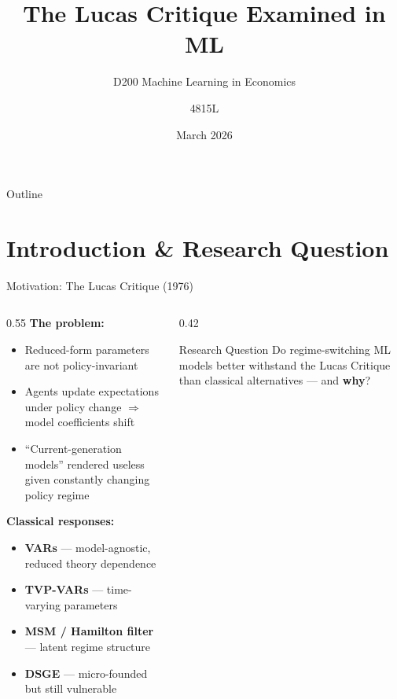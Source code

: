 \documentclass[aspectratio=169, 10pt]{beamer}
\title[Lucas Critique \& ML]{The Lucas Critique Examined in ML}
\subtitle{D200 Machine Learning in Economics}
\author{4815L}
\institute{University of Cambridge}
\date{March 2026}
\begin{document}
\begin{frame}
  \titlepage
\end{frame}

\begin{frame}{Outline}
  \tableofcontents
\end{frame}

\section{Introduction \& Research Question}

\begin{frame}{Motivation: The Lucas Critique (1976)}

  \begin{columns}[T]
    \begin{column}{0.55\textwidth}
      \textbf{The problem:}
      \begin{itemize}\setlength\itemsep{4pt}
        \item Reduced-form parameters are \alert{not policy-invariant}
        \item Agents update expectations under policy change $\Rightarrow$ model coefficients shift
        \item ``Current-generation models'' rendered useless given constantly changing policy regime
      \end{itemize}

      \vspace{6pt}
      \textbf{Classical responses:}
      \begin{itemize}\setlength\itemsep{2pt}
        \item \textbf{VARs} — model-agnostic, reduced theory dependence
        \item \textbf{TVP-VARs} — time-varying parameters
        \item \textbf{MSM / Hamilton filter} — latent regime structure
        \item \textbf{DSGE} — micro-founded but still vulnerable
      \end{itemize}
    \end{column}
    \begin{column}{0.42\textwidth}
      \begin{alertblock}{Research Question}
        Do regime-switching ML models better withstand the Lucas Critique than classical alternatives — and \textbf{why}?
      \end{alertblock}


\end{column}
\end{columns}
\end{frame}
\end{document}
